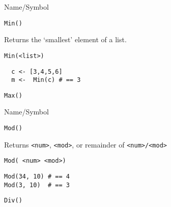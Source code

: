 \begin{desc}{Name/Symbol}
\item[Name/Symbol]	\verb+Min()+

\item[Description]	Returns the `smallest' element of a list.

\item[Usage]	
\begin{verbatim}
Min(<list>)
\end{verbatim}

\item[Example]	
\begin{verbatim}
  c <- [3,4,5,6]
  m <-  Min(c) # == 3
\end{verbatim}

\item[See Also]	\verb+Max()+
\end{desc}

\begin{desc}{Name/Symbol}
\item[Name/Symbol]	\verb+Mod()+

\item[Description]	Returns \verb+<num>+, \verb+<mod>+, or remainder of \verb+<num>/<mod>+

\item[Usage]		
\begin{verbatim}
Mod( <num> <mod>)
\end{verbatim}

\item[Example]	
\begin{verbatim}
Mod(34, 10)	# == 4
Mod(3, 10)	# == 3
\end{verbatim}

\item[See Also]	\verb+Div()+
\end{desc}

